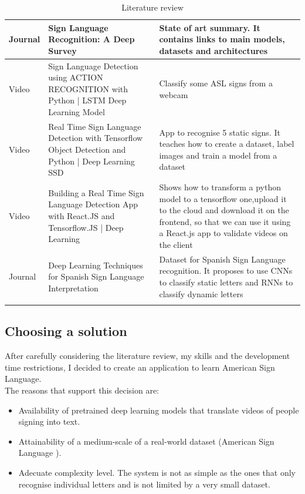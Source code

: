\begin{longtable}{|p{3cm}|p{4cm}|p{6cm}|}
    \hline Journal & Sign Language Recognition: A Deep Survey \cite{Rastgoo2021} & State of art summary. It contains links to main models, datasets and architectures \\
    \hline Video   & Sign Language Detection using ACTION RECOGNITION with Python | LSTM Deep Learning Model \cite{SignLanguageRecognitionUsingActionRecognition} & Classify some ASL signs from a webcam \\
    \hline Video   & Real Time Sign Language Detection with Tensorflow Object Detection and Python | Deep Learning SSD \cite{SignLanguageRecognitionUsingObjectDetection} & App to recognise 5 static signs. It teaches how to create a dataset, label images and train a model from a dataset \\
    \hline Video   & Building a Real Time Sign Language Detection App with React.JS and Tensorflow.JS | Deep Learning \cite{SignLanguageRecognitionUsingReactjsAndTensorflow} & Shows how to transform a python model to a tensorflow one,upload it to the cloud and download it on the frontend, so that we can use it using a React.js app to validate videos on the client \\
    \hline Journal & Deep Learning Techniques for Spanish Sign Language Interpretation \cite{SpanishDataset2021} & Dataset for Spanish Sign Language recognition. It proposes to use CNNs to classify static letters and RNNs to classify dynamic letters \\
    \hline
    \caption{Literature review}
    \label{table:introduction_literature_review}
\end{longtable}

\subsection{Choosing a solution}
After carefully considering the literature review, my skills and the development time restrictions, I decided to create an application to learn American Sign Language. \\

The reasons that support this decision are:

\begin{itemize}[noitemsep]
    \item Availability of pretrained deep learning models that translate videos of people signing into text.
    \item Attainability of a medium-scale of a real-world dataset (American Sign Language \cite{Li2019}).
    \item Adecuate complexity level. The system is not as simple as the ones that only recognise individual letters and is not limited by a very small dataset.
\end{itemize}

